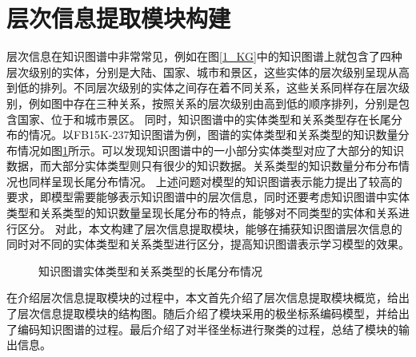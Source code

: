 \documentclass[algorithmlist, AutoFakeBold, AutoFakeSlant, figurelist, tablelist, nomlist, engineering]{seuthesix}
\begin{document}
\section{层次信息提取模块构建}
层次信息在知识图谱中非常常见，例如在图\ref{1_KG}中的知识图谱上就包含了四种层次级别的实体，分别是大陆、国家、城市和景区，这些实体的层次级别呈现从高到低的排列。不同层次级别的实体之间存在着不同关系，这些关系同样存在层次级别，例如图中存在三种关系，按照关系的层次级别由高到低的顺序排列，分别是包含国家、位于和城市景区。
同时，知识图谱中的实体类型和关系类型存在长尾分布的情况。以FB15K-237知识图谱为例，图谱的实体类型和关系类型的知识数量分布情况如图\ref{2_LongTail}所示。可以发现知识图谱中的一小部分实体类型对应了大部分的知识数据，而大部分实体类型则只有很少的知识数据。关系类型的知识数量分布分布情况也同样呈现长尾分布情况。
上述问题对模型的知识图谱表示能力提出了较高的要求，即模型需要能够表示知识图谱中的层次信息，同时还要考虑知识图谱中实体类型和关系类型的知识数量呈现长尾分布的特点，能够对不同类型的实体和关系进行区分。
对此，本文构建了层次信息提取模块，能够在捕获知识图谱层次信息的同时对不同的实体类型和关系类型进行区分，提高知识图谱表示学习模型的效果。
\begin{figure}
  \centering
  \caption{知识图谱实体类型和关系类型的长尾分布情况}
  \label{2_LongTail}
\end{figure}

在介绍层次信息提取模块的过程中，本文首先介绍了层次信息提取模块概览，给出了层次信息提取模块的结构图。随后介绍了模块采用的极坐标系编码模型，并给出了编码知识图谱的过程。最后介绍了对半径坐标进行聚类的过程，总结了模块的输出信息。
\end{document}
